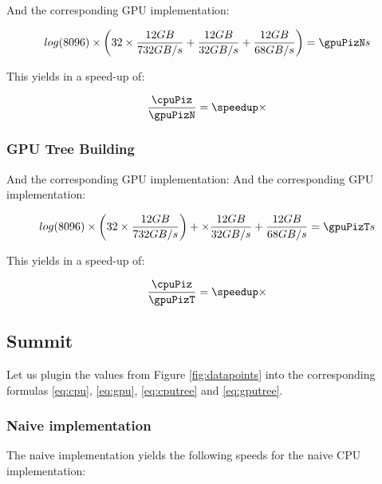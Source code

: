 \documentclass[]{article}
\begin{document}
And the corresponding GPU implementation:
\pgfmathsetmacro{}
\begin{center}
	\begin{equation}
		log(\d) \times \left ( 32 \times \frac{12 GB}{732 GB/s} + \frac{12 GB}{32 GB/s}  + \frac{12 GB}{68 GB/s} \right )=  \gpuPizN s
	\end{equation}
\end{center}

This yields in a speed-up of:
\pgfmathsetmacro\speedup{\cpuPiz / \gpuPizN}
\begin{center}
	\begin{equation}
		\frac{\cpuPiz}{\gpuPizN} = \speedup \times
	\end{equation}
\end{center}


\subsubsection{GPU Tree Building}

And the corresponding GPU implementation:
\pgfmathsetmacro{}
And the corresponding GPU implementation:
\begin{center}
	\begin{equation}
		log(\d) \times \left ( \p \times \frac{\s GB}{732 GB/s} \right ) + \times \frac{\s GB}{32 GB/s}  + \frac{\s GB}{68 GB/s} = \gpuPizT s
	\end{equation}
\end{center}

This yields in a speed-up of:
\pgfmathsetmacro\speedup{\cpuPiz / \gpuPizT}
\begin{center}
	\begin{equation}
		\frac{\cpuPiz}{\gpuPizT} = \speedup \times
	\end{equation}
\end{center}

\vspace{5mm}


\subsection{Summit}

Let us plugin the values from Figure \ref{fig:datapoints} into the corresponding formulas \ref{eq:cpu}, \ref{eq:gpu}, \ref{eq:cputree} and \ref{eq:gputree}.

\subsubsection{Naive implementation}
The naive implementation yields the following speeds for the naive CPU  implementation:
\end{document}
